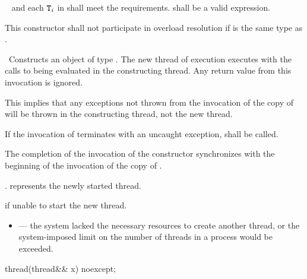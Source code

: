 \begin{itemdescr}
\pnum
\requires\  and each $\texttt{T}_i$ in  shall meet the
 requirements.
shall be a valid expression.

\pnum
\remarks
This constructor shall not participate in overload resolution if 
is the same type as .

\pnum
\effects\ Constructs an object of type . The new thread of execution executes
 with the calls to
 being evaluated in the constructing thread. Any return value from this invocation
is ignored. \begin{note} This implies that any exceptions not thrown from the invocation of the copy
of  will be thrown in the constructing thread, not the new thread. \end{note} If the
invocation of
termi\-nates with an uncaught exception,  shall be called.


\pnum\sync The completion of the invocation of the constructor
synchronizes with the beginning of the invocation of the copy of .

\pnum\ensures {}.  represents the newly started thread.

\pnum\throws {} if unable to start the new thread.

\pnum\errors
\begin{itemize}
\item {} --- the system lacked the necessary
resources to create another thread, or the system-imposed limit on the number of
threads in a process would be exceeded.
\end{itemize}
\end{itemdescr}

%
\begin{itemdecl}
thread(thread&& x) noexcept;
\end{itemdecl}

